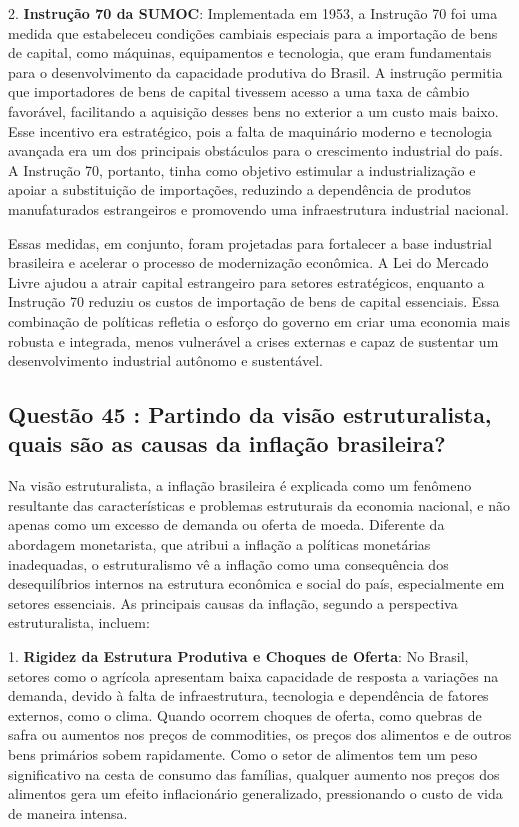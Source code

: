 \documentclass[a4paper,12pt]{article}[abntex2]
\begin{document}
2. \textbf{Instrução 70 da SUMOC}: Implementada em 1953, a Instrução 70 foi uma medida que estabeleceu condições cambiais especiais para a importação de bens de capital, como máquinas, equipamentos e tecnologia, que eram fundamentais para o desenvolvimento da capacidade produtiva do Brasil. A instrução permitia que importadores de bens de capital tivessem acesso a uma taxa de câmbio favorável, facilitando a aquisição desses bens no exterior a um custo mais baixo. Esse incentivo era estratégico, pois a falta de maquinário moderno e tecnologia avançada era um dos principais obstáculos para o crescimento industrial do país. A Instrução 70, portanto, tinha como objetivo estimular a industrialização e apoiar a substituição de importações, reduzindo a dependência de produtos manufaturados estrangeiros e promovendo uma infraestrutura industrial nacional.

Essas medidas, em conjunto, foram projetadas para fortalecer a base industrial brasileira e acelerar o processo de modernização econômica. A Lei do Mercado Livre ajudou a atrair capital estrangeiro para setores estratégicos, enquanto a Instrução 70 reduziu os custos de importação de bens de capital essenciais. Essa combinação de políticas refletia o esforço do governo em criar uma economia mais robusta e integrada, menos vulnerável a crises externas e capaz de sustentar um desenvolvimento industrial autônomo e sustentável.

\subsection{\textbf{Questão 45 : Partindo da visão estruturalista, quais são as causas da inflação brasileira?}}

Na visão estruturalista, a inflação brasileira é explicada como um fenômeno resultante das características e problemas estruturais da economia nacional, e não apenas como um excesso de demanda ou oferta de moeda. Diferente da abordagem monetarista, que atribui a inflação a políticas monetárias inadequadas, o estruturalismo vê a inflação como uma consequência dos desequilíbrios internos na estrutura econômica e social do país, especialmente em setores essenciais. As principais causas da inflação, segundo a perspectiva estruturalista, incluem:

1. \textbf{Rigidez da Estrutura Produtiva e Choques de Oferta}: No Brasil, setores como o agrícola apresentam baixa capacidade de resposta a variações na demanda, devido à falta de infraestrutura, tecnologia e dependência de fatores externos, como o clima. Quando ocorrem choques de oferta, como quebras de safra ou aumentos nos preços de commodities, os preços dos alimentos e de outros bens primários sobem rapidamente. Como o setor de alimentos tem um peso significativo na cesta de consumo das famílias, qualquer aumento nos preços dos alimentos gera um efeito inflacionário generalizado, pressionando o custo de vida de maneira intensa.
\end{document}
